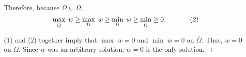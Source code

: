\documentclass[11pt]{article}
\begin{document}
\begin{itemize}
\noindent Therefore, because $\Omega\subseteq \overline{\Omega}$,
\[
\max\limits_{\overline{\Omega}}\;w\geq \max\limits_\Omega\;w\geq \min\limits_\Omega\;w\geq\min\limits_{\overline{\Omega}}\geq 0.\hspace{.5in}(2)
\]

\vspace{.2in} (1) and (2) together imply that $\max\;w=0$ and $\min\;w=0$ on $\overline{\Omega}$. Thus, $w=0$ on $\overline{\Omega}$.  Since $w$ was an arbitrary solution, $w=0$ is the only solution.\hfill $\Box$


\end{itemize}
\end{document}
